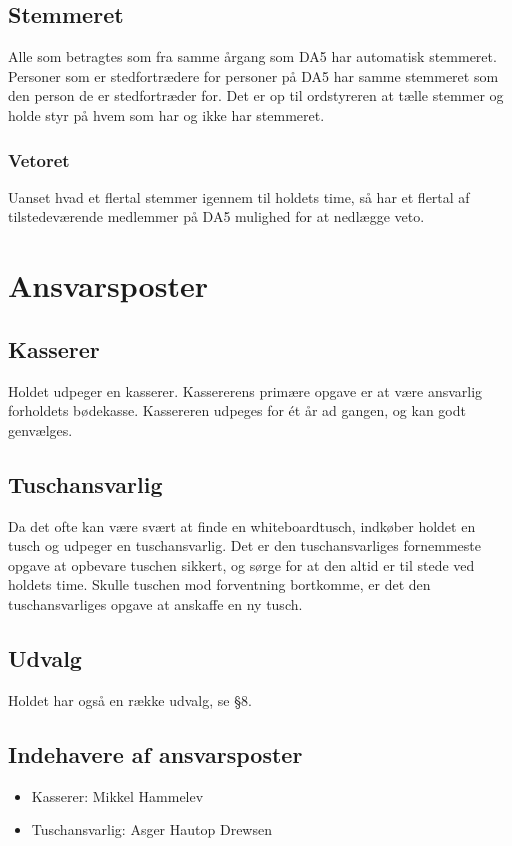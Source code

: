 \documentclass{article}
\let\OldS\S
\renewcommand{\S}{\OldS{}}
\begin{document}
	\subsection{Stemmeret}
	Alle som betragtes som fra samme årgang som DA5 har automatisk stemmeret. Personer som er stedfortrædere for personer på DA5 har samme stemmeret som den person de er stedfortræder for. Det er op til ordstyreren at tælle stemmer og holde styr på hvem som har og ikke har stemmeret.
	\subsubsection{Vetoret}
	Uanset hvad et flertal stemmer igennem til holdets time, så har et flertal af tilstedeværende medlemmer på DA5 mulighed for at nedlægge veto.

	\section{Ansvarsposter}
	\subsection{Kasserer}
	Holdet udpeger en kasserer. Kassererens primære opgave er at være ansvarlig forholdets bødekasse. Kassereren udpeges for ét år ad gangen, og kan godt genvælges.
	\subsection{Tuschansvarlig}
	Da det ofte kan være svært at finde en whiteboardtusch, indkøber holdet en tusch og udpeger en tuschansvarlig. Det er den tuschansvarliges fornemmeste opgave at opbevare tuschen sikkert, og sørge for at den altid er til stede ved holdets time. Skulle
	tuschen mod forventning bortkomme, er det den tuschansvarliges opgave at anskaffe en
	ny tusch.
	\subsection{Udvalg}
	Holdet har også en række udvalg, se \S8.
	\subsection{Indehavere af ansvarsposter}
	\begin{itemize}
		\item Kasserer: Mikkel Hammelev
		\item Tuschansvarlig: Asger Hautop Drewsen
	\end{itemize}
\end{document}
